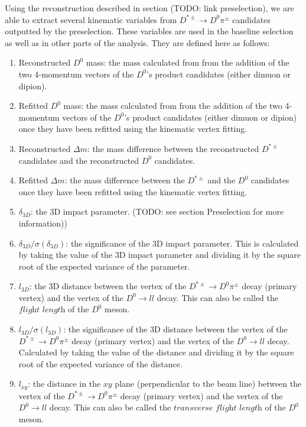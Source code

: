 Using the reconstruction described in section (TODO: link preselection), we are able to extract several kinematic variables from $D^{*\pm} \to D^0 \pi^\pm$ candidates outputted by the preselection. These variables are used in the baseline selection as well as in other parts of the analysis. They are defined here as follows:
\begin{enumerate}
    \item Reconstructed $D^0$ mass: the mass calculated from from the addition of the two 4-momentum vectors of the $D^0$'s product candidates (either dimuon or dipion). 
    \item Refitted $D^0$ mass: the mass calculated from from the addition of the two 4-momentum vectors of the $D^0$'s product candidates (either dimuon or dipion) once they have been refitted using the kinematic vertex fitting. 
    \item Reconstructed $\Delta m$: the mass difference between the reconstructed $D^{*\pm}$ candidates and the reconstructed $D^0$ candidates. 
    \item Refitted $\Delta m$: the mass difference between the $D^{*\pm}$ and the $D^0$ candidates once they have been refitted using the kinematic vertex fitting.
    \item $\delta_{3D}$: the 3D impact parameter. (TODO: see section Preselection for more information))
    \item $\delta_{3D}/\sigma\left(\delta_{3D}\right)$: the significance of the 3D impact parameter. This is calculated by taking the value of the 3D impact parameter and dividing it by the square root of the expected variance of the parameter. 
    \item $l_{3D}$: the 3D distance between the vertex of the $D^{*\pm} \to D^0 \pi^\pm$ decay (primary vertex) and the vertex of the $D^0 \to l l$ decay. This can also be called the $\textit{flight length}$ of the $D^0$ meson. 
    \item $l_{3D}/\sigma\left(l_{3D}\right)$: the significance of the 3D distance between the vertex of the $D^{*\pm} \to D^0 \pi^\pm$ decay (primary vertex) and the vertex of the $D^0 \to l l$ decay. Calculated by taking the value of the distance and dividing it by the square root of the expected variance of the distance. 
    \item $l_{xy}$: the distance in the $xy$ plane (perpendicular to the beam line) between the vertex of the $D^{*\pm} \to D^0 \pi^\pm$ decay (primary vertex) and the vertex of the $D^0 \to l l$ decay.  This can also be called the $\textit{transverse flight length}$ of the $D^0$ meson. 

\end{enumerate}
